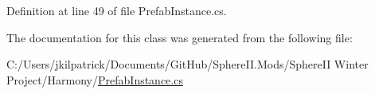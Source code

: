 Definition at line 49 of file Prefab\+Instance.\+cs.



The documentation for this class was generated from the following file\+:\begin{DoxyCompactItemize}
\item 
C\+:/\+Users/jkilpatrick/\+Documents/\+Git\+Hub/\+Sphere\+I\+I.\+Mods/\+Sphere\+I\+I Winter Project/\+Harmony/\mbox{\hyperlink{_prefab_instance_8cs}{Prefab\+Instance.\+cs}}\end{DoxyCompactItemize}
